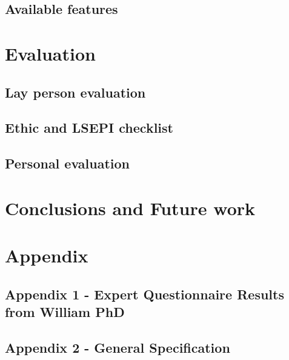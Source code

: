 \documentclass[11pt,twoside]{article}
\begin{document}
\clearpage
\subsection{Available features}




\clearpage


\section{Evaluation}

\subsection{Lay person evaluation}



\clearpage
\subsection{Ethic and LSEPI checklist}


\clearpage
\subsection{Personal evaluation}



\clearpage
\section{Conclusions and Future work}





\clearpage
\section{Appendix}
\clearpage

\subsection {Appendix 1 - Expert Questionnaire Results from William PhD}


\clearpage

\subsection {Appendix 2 - General Specification}

\end{document}
